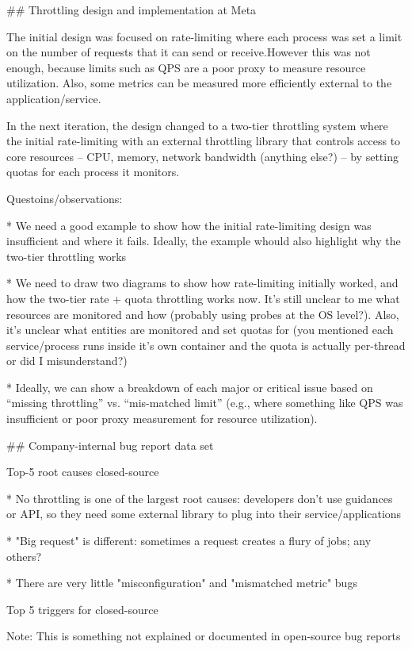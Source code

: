 ## Throttling design and implementation at Meta

The initial design was focused on rate-limiting where each process was set a limit on the number of requests that it can send or receive.However this was not enough, because limits such as QPS are a poor proxy to measure resource utilization. Also, some metrics can be measured more efficiently external to the application/service.

In the next iteration, the design changed to a two-tier throttling system where the initial rate-limiting with an external throttling library that controls access to core resources -- CPU, memory, network bandwidth (anything else?) -- by setting quotas for each process it monitors.

Questoins/observations:

* We need a good example to show how the initial rate-limiting design was insufficient and where it fails. Ideally, the example whould also highlight why the two-tier throttling works

* We need to draw two diagrams to show how rate-limiting initially worked, and how the two-tier rate + quota throttling works now. It's still unclear to me what resources are monitored and how (probably using probes at the OS level?). Also, it's unclear what entities are monitored and set quotas for (you mentioned each service/process runs inside it's own container and the quota is actually per-thread or did I misunderstand?)

* Ideally, we can show a breakdown of each major or critical issue based on ``missing throttling'' vs. ``mis-matched limit'' (e.g., where something like QPS was insufficient or poor proxy measurement for resource utilization).

## Company-internal bug report data set


Top-5 root causes closed-source

* No throttling is one of the largest root causes: developers don't use guidances or API, so they need some external library to plug into their service/applications

* "Big request" is different: sometimes a request creates a flury of jobs; any others?

* There are very little "misconfiguration" and "mismatched metric" bugs

Top 5 triggers for closed-source

Note: This is something not explained or documented in open-source bug reports 
